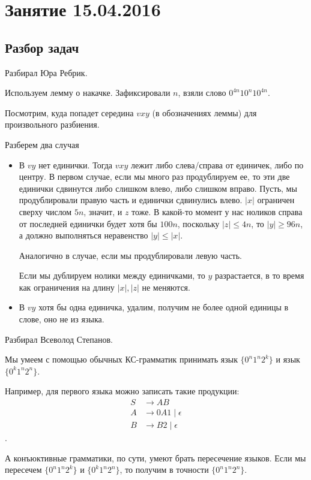 \chapter{Занятие 15.04.2016}
\section{Разбор задач}

Разбирал Юра Ребрик.

Используем лемму о накачке. Зафиксировали $n$, взяли слово $0^{4n}10^n10^{4n}$.

Посмотрим, куда попадет середина $vxy$ (в обозначениях леммы) для произвольного разбиения.

Разберем два случая
\begin{itemize}
\item
В $vy$ нет единички.
Тогда $vxy$ лежит либо слева/справа от единичек, либо по центру.
В первом случае, если мы много раз продублируем ее, то эти две единички сдвинутся либо слишком влево, либо слишком вправо.
Пусть, мы продублировали правую часть и единички сдвинулись влево. $|x|$ ограничен сверху числом $5n$, значит, и $z$ тоже. 
В какой-то момент у нас ноликов справа от последней единички будет хотя бы $100n$, поскольку $|z| \leq 4n$, то $|y| \geq 96n$, а должно выполняться неравенство $|y| \leq |x|$.

Аналогично в случае, если мы продублировали левую часть.

Если мы дублируем нолики между единичками, то $y$ разрастается, в то время как ограничения на длину $|x|, |z|$ не меняются.

\item
В $vy$ хотя бы одна единичка, удалим, получим не более одной единицы в слове, оно не из языка.
\end{itemize}

Разбирал Всеволод Степанов.

Мы умеем с помощью обычных КС-грамматик принимать язык $\{0^n1^n2^k\}$ и язык $\{0^k1^n2^n\}$.

Например, для первого языка можно записать такие продукции: 
\begin{align*}
S &\to AB \\
A &\to 0A1 \mid \epsilon \\ 
B &\to B2 \mid \epsilon
\end{align*}.

А конъюктивные грамматики, по сути, умеют брать пересечение языков. Если мы пересечем $\{0^n1^n2^k\}$ и $\{0^k1^n2^n\}$, то получим в точности $\{0^n1^n2^n\}$.


